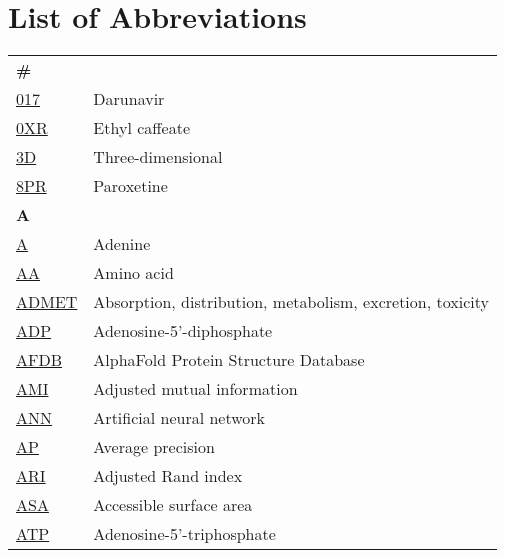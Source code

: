 \chapter*{List of Abbreviations}

\begin{longtable}[l]{@{}p{2.5cm}p{12cm}@{}}
\textbf{\large \#} & \\[0.25cm]
\textmd{\href{https://www.ebi.ac.uk/pdbe-srv/pdbechem/chemicalCompound/show/017}{017}} & Darunavir \\
\textmd{\href{https://www.ebi.ac.uk/pdbe-srv/pdbechem/chemicalCompound/show/0XR}{0XR}} & Ethyl caffeate \\
\textmd{\href{https://en.wikipedia.org/wiki/Three-dimensional_space}{3D}} & Three-dimensional \\
\textmd{\href{https://www.ebi.ac.uk/pdbe-srv/pdbechem/chemicalCompound/show/8PR}{8PR}} & Paroxetine \\[0.3175cm]
\textbf{\large A} & \\[0.25cm]
\textmd{\href{https://en.wikipedia.org/wiki/Adenine}{A}} & Adenine \\
\textmd{\href{https://en.wikipedia.org/wiki/Amino_acid}{AA}} & Amino acid \\
\textmd{\href{https://en.wikipedia.org/wiki/ADME}{ADMET}} & Absorption, distribution, metabolism, excretion, toxicity \\
\textmd{\href{https://www.ebi.ac.uk/pdbe-srv/pdbechem/chemicalCompound/show/ADP}{ADP}} & Adenosine-5'-diphosphate \\
\textmd{\href{https://alphafold.ebi.ac.uk/}{AFDB}} & AlphaFold Protein Structure Database \\
\textmd{\href{https://en.wikipedia.org/wiki/Adjusted_mutual_information}{AMI}} & Adjusted mutual information \\
\textmd{\href{https://en.wikipedia.org/wiki/Neural_network_(machine_learning)}{ANN}} & Artificial neural network \\
\textmd{\href{https://en.wikipedia.org/wiki/Evaluation_measures_(information_retrieval)}{AP}} & Average precision \\
\textmd{\href{https://en.wikipedia.org/wiki/Rand_index}{ARI}} & Adjusted Rand index \\
\textmd{\href{https://en.wikipedia.org/wiki/Accessible_surface_area}{ASA}} & Accessible surface area \\
\textmd{\href{https://www.ebi.ac.uk/pdbe-srv/pdbechem/chemicalCompound/show/ATP}{ATP}} & Adenosine-5’-triphosphate \\

\end{longtable}
